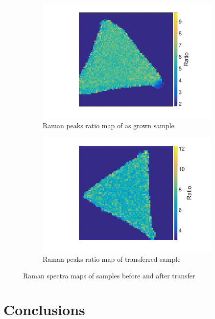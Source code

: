 \begin{figure}[H]
\begin{center}
\begin{subfigure}[b]{0.4\textwidth}
			\includegraphics[scale=0.15]{Transfer/TransferRamanRatioMapAsgrown.png}
			\caption{Raman peaks ratio map of as grown sample}
			\label{fig:TransferRamanRatioAMapAsgrown}
		\end{subfigure}
		\quad
		\begin{subfigure}[b]{0.4\textwidth}
			\includegraphics[scale=0.15]{Transfer/TransferRamanRatioMapTransferred.png}
			\caption{Raman peaks ratio map of transferred sample}
			\label{fig:TransferRamanRatioAMapTransferred}
		\end{subfigure}
		\caption{Raman spectra maps of samples before and after transfer}
		\label{fig:TransferRamanDiffRatioMapsComparison}
	\end{center}
\end{figure}

\section{Conclusions}

